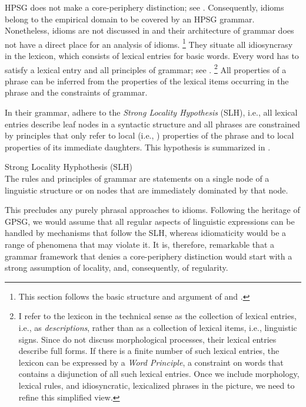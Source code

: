\documentclass[output=paper,biblatex,babelshorthands,newtxmath,draftmode,colorlinks,citecolor=brown]{langscibook}
\begin{document}

\largerpage
HPSG does not make a core-periphery distinction; see \citet{MuellerKernigkeit}. Consequently, idioms belong to the empirical domain to be covered by an HPSG grammar.
Nonetheless, idioms are not discussed in \citet{ps2} and their architecture of grammar does not have a direct place for an analysis of idioms.%
\footnote{This section follows the basic structure and argument of \citet{Sailer:12} and \citet{Richter:Sailer:14}.} 
They situate all idiosyncrasy in the lexicon, which consists of lexical entries for basic words. 
Every word has to satisfy a lexical entry and all principles of grammar; see .%
\footnote{I refer to the lexicon in the technical sense as the collection of lexical entries, i.e., as \emph{descriptions}, rather than as a collection of lexical items, i.e., linguistic signs. 
Since \citet{ps2} do not discuss morphological processes, their lexical entries describe full forms. 
If there is a finite number of such lexical entries, the
lexicon can be expressed by a \emph{Word Principle}, a constraint on words that contains a disjunction of all such lexical entries. 
Once we include morphology, lexical rules, and 
idiosyncratic, lexicalized phrases
in the picture, we need to refine this simplified view.
%
}
%
All properties of a phrase can be inferred from the properties of the lexical items occurring in the phrase and the constraints of grammar. 

In their grammar, \citet{ps2} adhere to the \emph{Strong Locality Hypothesis}
(SLH), i.e., all lexical entries describe
leaf nodes in a syntactic structure and all phrases are constrained by principles that only refer to
local (i.e., ) properties of the phrase and to local properties of its immediate
daughters. This hypothesis is summarized in . 

\eanoraggedright
Strong Locality Hyphothesis\label{slh} (SLH)\\
The rules and principles of grammar are statements on a single node of a linguistic structure or on nodes that are immediately dominated by that node.
\z 

\noindent
This precludes any purely phrasal approaches to idioms.  Following the heritage of GPSG\indexgpsg,
we would assume that all regular aspects of linguistic expressions can be handled by mechanisms that
follow the SLH, whereas idiomaticity would be a range of phenomena that may violate it.  It is,
therefore, remarkable that a grammar framework that denies a core-periphery distinction would start
with a strong assumption of locality, and, consequently, of regularity.
\end{document}
